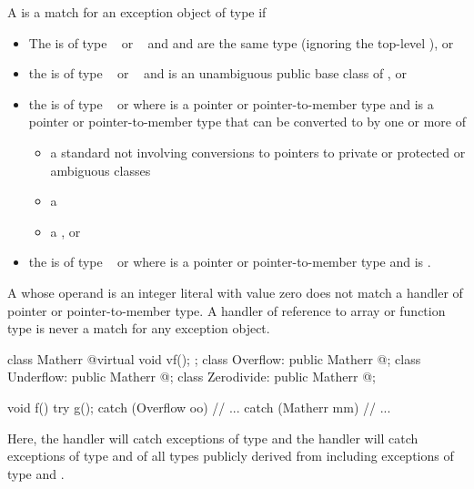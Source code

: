 \pnum
{}%
A
is a match for
an exception object
of type
if
\begin{itemize}
\item%
The  is of type \cv{}~ or
\cv{}~ and
 and 
are the same type (ignoring the top-level ), or
\item%
the  is of type \cv{}~ or
\cv{}~ and
 is an unambiguous public base class of , or
\item%
the  is of type \cv{}~ or 
where  is a pointer or pointer-to-member type and
 is a pointer or pointer-to-member type
that can be converted to  by one or more of
\begin{itemize}

\item%
a standard  not involving conversions
to pointers to private or protected or ambiguous classes
\item%
a 
\item%
a , or
\end{itemize}

\item
the  is of type \cv{}~ or  where  is a pointer or pointer-to-member type and  is .
\end{itemize}

\begin{note}
A
whose operand is an integer literal with value zero does not match a handler of
pointer or pointer-to-member type.
A handler of reference to array or function type
is never a match for any exception object.
\end{note}

\begin{example}
\begin{codeblock}
class Matherr { @\commentellip@ virtual void vf(); };
class Overflow: public Matherr { @\commentellip@ };
class Underflow: public Matherr { @\commentellip@ };
class Zerodivide: public Matherr { @\commentellip@ };

void f() {
  try {
    g();
  } catch (Overflow oo) {
    // ...
  } catch (Matherr mm) {
    // ...
  }
}
\end{codeblock}
Here, the
handler will catch exceptions of type
and the
handler will catch exceptions of type
and of all types publicly derived from
including exceptions of type
and
.
\end{example}

